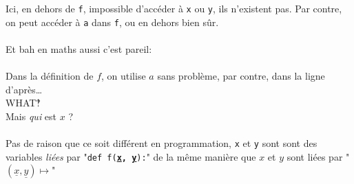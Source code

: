 \documentclass{article}
\newcommand{\singlecomparison}[2]{%
\begin{table}[H]
	\centering
	\begin{tabular}{p{7.5cm}|p{7.5cm}}
\begin{minipage}{0.5\linewidth}
\begin{verbatim}
#1
\end{verbatim}
\end{minipage}
       & #2
\end{tabular}
\end{table}
}
\begin{document}
Ici, en dehors de \texttt{f}, impossible d'accéder à \texttt{x} ou \texttt{y}, ils n'existent pas.
Par contre, on peut accéder à \texttt{a} dans \texttt{f}, ou en dehors bien sûr.\\

\paragraph{}
Et bah en maths aussi c'est pareil:
\paragraph{}
\paragraph{}
Dans la définition de $f$, on utilise $a$ sans problème, par contre, dans la ligne d'après\ldots
\vspace{.5cm}
\\{\Large{WHAT‽}}
\\{\large{Mais \emph{qui} est $x$ ?}}
\\\paragraph{}
Pas de raison que ce soit différent en programmation, 
\texttt{x} et \texttt{y} sont sont des variables \emph{liées} par "\texttt{def~f(\textbf{\underline{x},~\underline{y}}):}"
de la même manière que $x$ et $y$ sont liées par "$(\underline{x}, \underline{y}) \mapsto$"



\end{document}
